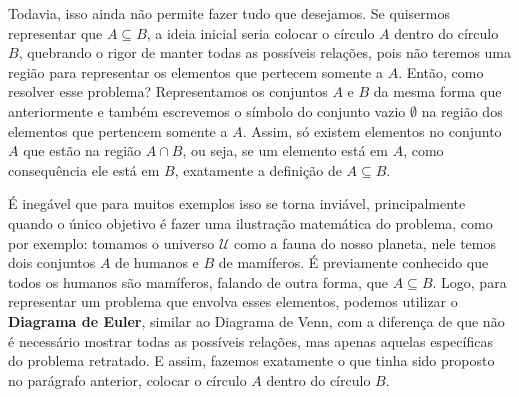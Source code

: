 
  Todavia, isso ainda não permite fazer tudo que desejamos. Se quisermos representar que $A \subseteq B$, a ideia inicial seria colocar o círculo $A$ dentro do círculo $B$, quebrando o rigor de manter todas as possíveis relações, pois não teremos uma região para representar os elementos que pertecem somente a $A$. Então, como resolver esse problema? Representamos os conjuntos $A$ e $B$ da mesma forma que anteriormente e também escrevemos o símbolo do conjunto vazio $\emptyset$ na região dos elementos que pertencem somente a $A$. Assim, só existem elementos no conjunto $A$ que estão na região $A\cap B$, ou seja, se um elemento está em $A$, como consequência ele está em $B$, exatamente a definição de $A \subseteq B$.


  É inegável que para muitos exemplos isso se torna inviável, principalmente quando o único objetivo é fazer uma ilustração matemática do problema, como por exemplo: tomamos o universo $\mathcal U$ como a fauna do nosso planeta, nele temos dois conjuntos $A$ de humanos e $B$ de mamíferos. É previamente conhecido que todos os humanos são mamíferos, falando de outra forma, que $A \subseteq B$. Logo, para representar um problema que envolva esses elementos, podemos utilizar o \textbf{Diagrama de Euler}, similar ao Diagrama de Venn, com a diferença de que não é necessário mostrar todas as possíveis relações, mas apenas aquelas específicas do problema retratado. E assim, fazemos exatamente o que tinha sido proposto no parágrafo anterior, colocar o círculo $A$ dentro do círculo $B$.


